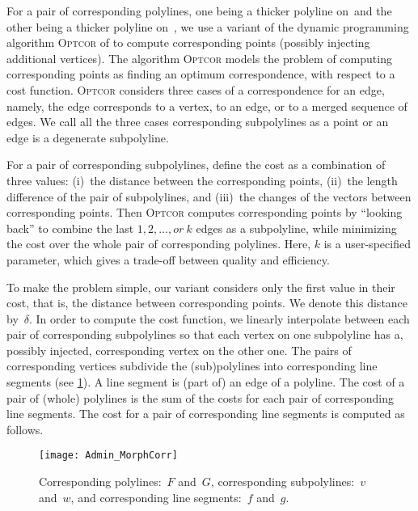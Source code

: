 For a pair of corresponding polylines, 
one being a thicker polyline on~\ml and 
the other being a thicker polyline on~\ms, 
we use a variant of the dynamic programming algorithm \textsc{Optcor} of \textcite{Noellenburg2008} to
compute corresponding points (possibly injecting additional
vertices).
The algorithm \textsc{Optcor} models the problem of 
computing corresponding points as 
finding an optimum correspondence, 
with respect to a cost function.
\textsc{Optcor} considers three cases of a 
correspondence for an edge, namely, 
the edge corresponds to a vertex, 
to an edge, or to a merged sequence of edges.
We call all the three cases corresponding subpolylines
as a point or an edge is a degenerate subpolyline. 

For a pair of corresponding subpolylines, 
\textcite{Noellenburg2008} define the cost 
as a combination of three values: 
(i)~the distance between the corresponding points, 
(ii)~the length difference of the pair of subpolylines, and 
(iii)~the changes of the vectors between corresponding points. 
Then \textsc{Optcor} computes corresponding points 
by ``looking back'' to combine 
the last $1,2,\ldots, or~k$ edges as a subpolyline, 
while minimizing the cost over 
the whole pair of corresponding polylines. 
Here, $k$ is a user-specified parameter, 
which gives a trade-off between quality and efficiency.

To make the problem simple, 
our variant considers only the first value in their cost, 
that is, the distance between corresponding points. 
We denote this distance by~$\delta$.  
In order to compute the cost function, we linearly
interpolate between each pair of corresponding subpolylines 
so that each vertex on one subpolyline has a, possibly injected, 
corresponding vertex on the other one.
The pairs of corresponding vertices
subdivide the (sub)polylines into corresponding line segments
(see \fig\ref{fig:Admin_BasicConcepts}).  
A line segment is (part of) an edge of a polyline. 
The cost of a pair of (whole) polylines is 
the sum of the costs for each pair of 
corresponding line segments. 
The cost for a pair of corresponding line segments 
is computed as follows.

\begin{figure}[tb]
	\centering
	\texttt{[image: Admin\_MorphCorr]}
	\caption{Corresponding polylines:~$F$ and~$G$,
		corresponding subpolylines:~$v$ and~$w$,
		and corresponding line segments:~$f$ and~$g$.}
	\label{fig:Admin_BasicConcepts}
\end{figure}

